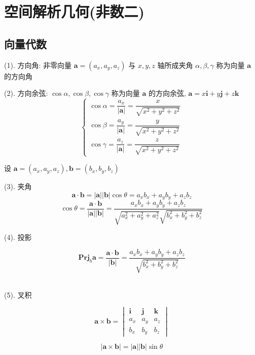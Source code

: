 \chapter{空间解析几何(非数二)}
\section{向量代数}
\begin{definition}[向量代数]
	(1). 方向角: 非零向量 $\boldsymbol{a} = (a_{x},a_{y},a_{z})$ 与 $x,y,z$ 轴所成夹角 $\alpha,\beta,\gamma$ 称为向量 $\boldsymbol{a}$ 的方向角 
	
	(2). 方向余弦: $\cos \alpha,\cos \beta,\cos\gamma$ 称为向量 $\boldsymbol{a}$ 的方向余弦, $\boldsymbol{a} = x\boldsymbol{i} + y\boldsymbol{j} + z\boldsymbol{k}$
	$$\begin{cases}
		\cos \alpha=\dfrac{a_{x}}{|\boldsymbol{a}|} = \dfrac{x}{\sqrt{x^{2}+y^{2}+z^{2}}}\\
		\cos \beta=\dfrac{a_{y}}{|\boldsymbol{a}|} = \dfrac{y}{\sqrt{x^{2}+y^{2}+z^{2}}}\\
		\cos \gamma=\dfrac{a_{z}}{|\boldsymbol{a}|} = \dfrac{z}{\sqrt{x^{2}+y^{2}+z^{2}}}
	\end{cases}$$

	设 $\boldsymbol{a} = (a_{x},a_{y},a_{z}), \boldsymbol{b} = (b_{x},b_{y},b_{z})$

	(3). 夹角
	$$\boldsymbol{a}\cdot \boldsymbol{b} = |\boldsymbol{a}||\boldsymbol{b}|\cos \theta = a_{x}b_{x}+a_{y}b_{y}+a_{z}b_{z}$$
	$$\cos \theta = \dfrac{\boldsymbol{a}\cdot \boldsymbol{b}}{|\boldsymbol{a}||\boldsymbol{b}|} = \dfrac{a_{x}b_{x}+a_{y}b_{y}+a_{z}b_{z}}{\sqrt{a_{x}^2+a_{y}^2+a_{z}^2}\sqrt{b_{x}^2+b_{y}^2+b_{z}^2}}$$
	
	(4). 投影

	$$\textbf{Prj}_{b}\boldsymbol{a}=\dfrac{\boldsymbol{a}\cdot \boldsymbol{b}}{|\boldsymbol{b}|}=\dfrac{a_{x}b_{x}+a_{y}b_{y}+a_{z}b_{z}}{\sqrt{b_{x}^2+b_{y}^2+b_{z}^2}}$$\

	(5). 叉积

	$$\boldsymbol{a}\times \boldsymbol{b} = \begin{vmatrix}
		\boldsymbol{i} & \boldsymbol{j} & \boldsymbol{k} \\
		a_{x} & a_{y} & a_{z} \\
		b_{x} & b_{y} & b_{z}
	\end{vmatrix}$$
	
	$$|\boldsymbol{a}\times \boldsymbol{b}| = |\boldsymbol{a}||\boldsymbol{b}|\sin\theta$$
\end{definition}

